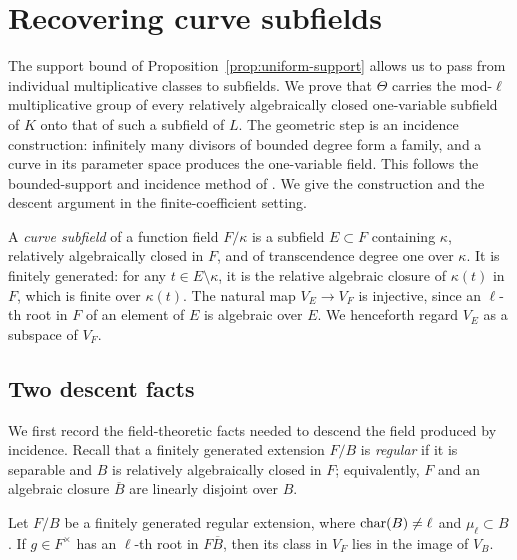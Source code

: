 \section{Recovering curve subfields}
\label{sec:curve-fields}

The support bound of Proposition~\ref{prop:uniform-support} allows us to
pass from individual multiplicative classes to subfields.  We prove that
$\Theta$ carries the mod-$\ell$ multiplicative group of every relatively
algebraically closed one-variable subfield of $K$ onto that of such a
subfield of $L$.  The geometric step is an incidence construction: infinitely
many divisors of bounded degree form a family, and a curve in its parameter
space produces the one-variable field.  This follows the bounded-support
and incidence method of \cite[Sections~4--6]{InternalBP}.  We give the
construction and the descent argument in the finite-coefficient setting.

A \emph{curve subfield} of a function field $F/\kappa$ is a subfield
$E\subset F$ containing $\kappa$, relatively algebraically closed in $F$,
and of transcendence degree one over $\kappa$.  It is finitely generated:
for any $t\in E\setminus\kappa$, it is the relative algebraic closure of
$\kappa(t)$ in $F$, which is finite over $\kappa(t)$.  The natural map
$V_E\to V_F$ is injective, since an $\ell$-th root in $F$ of an element
of $E$ is algebraic over $E$.  We henceforth regard $V_E$ as a subspace
of $V_F$.

\subsection{Two descent facts}

We first record the field-theoretic facts needed to descend the field
produced by incidence.  Recall that a finitely generated extension $F/B$
is \emph{regular} if it is separable and $B$ is relatively algebraically
closed in $F$; equivalently, $F$ and an algebraic closure $\overline B$ are
linearly disjoint over $B$.

\begin{lemma}
\label{lem:constant-descent}
Let $F/B$ be a finitely generated regular extension, where
$\operatorname{char}(B)\ne\ell$ and $\mu_\ell\subset B$.  If $g\in F^\times$
has an $\ell$-th root in $F\overline B$, then its class in $V_F$ lies
in the image of $V_B$.
\end{lemma}

